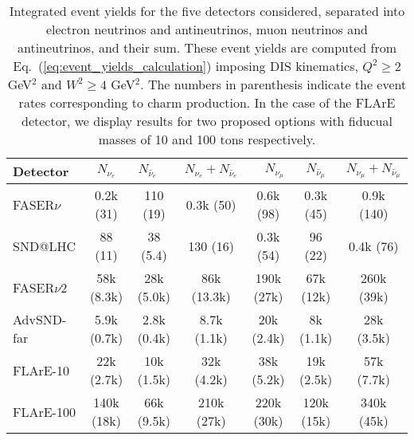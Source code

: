 \begin{table}[t]
  \centering
  \small
  \renewcommand{\arraystretch}{1.70}
\begin{tabularx}{\textwidth}{X|c|c|c|c|c|c}
\toprule
Detector & $\quad$ $N_{\nu_e}$ $\quad$ &$\quad$ $N_{\bar{\nu}_e}$$\quad$   &   $N_{\nu_e} + N_{\bar{\nu}_e}$ &
$\quad$$N_{\nu_\mu}$ $\quad$ & $\quad$ $N_{\bar{\nu}_\mu}$ $\quad$  &   $N_{\nu_\mu} + N_{\bar{\nu}_\mu}$ \\
\midrule
\midrule
FASER$\nu$  & 0.2k (31)    & 110 (19)  & 0.3k (50)  &  0.6k (98)  &  0.3k (45)  &  0.9k (140) \\
SND@LHC  &  88 (11)  & 38 (5.4)    & 130 (16)   &  0.3k (54) & 96 (22)   &  0.4k  (76)\\
\midrule
\midrule
FASER$\nu$2  & 58k (8.3k)   & 28k (5.0k)   & 86k (13.3k)  & 190k (27k)  & 67k (12k)    & 260k (39k)   \\
AdvSND-far  &  5.9k (0.7k)  & 2.8k (0.4k)   & 8.7k (1.1k)  & 20k (2.4k)  & 8k (1.1k)   & 28k (3.5k)   \\
FLArE-10 & 22k (2.7k) & 10k (1.5k)   &  32k (4.2k) &  38k (5.2k)&   19k (2.5k) &   57k (7.7k) \\
FLArE-100 &   140k (18k)         &    66k (9.5k)         &       210k (27k)       &   220k (30k)      &  120k (15k)    &  340k (45k)  \\
  \bottomrule
\end{tabularx}
\vspace{0.2cm}
\caption{\small Integrated event yields for the five detectors considered,
  separated into electron neutrinos and antineutrinos,
  muon neutrinos and antineutrinos, and their sum.
  These event yields are computed from Eq.~(\ref{eq:event_yields_calculation})
  imposing DIS kinematics, $Q^2 \ge 2$ GeV$^2$ and $W^2 \ge 4$ GeV$^2$.
 The numbers in parenthesis indicate the event rates corresponding to charm
 production.
 In the case of the FLArE detector, we display results for two proposed
 options with fiducual masses of 10 and 100 tons respectively.
  \label{tab:integrated_rates}
}
\end{table}
